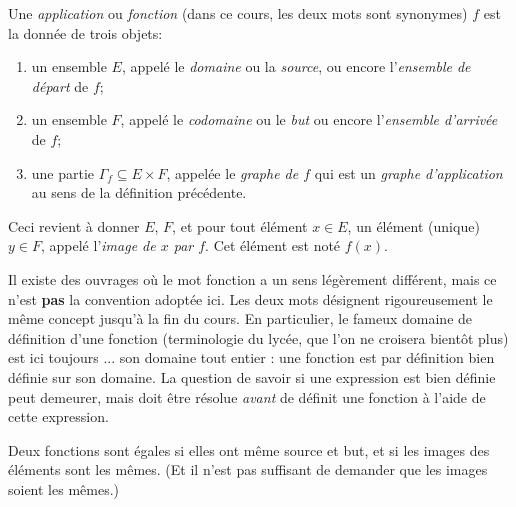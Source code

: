 \begin{definition}
Une \emph{application} ou \emph{fonction} (dans ce cours, les deux mots sont synonymes) $f$ est la donnée de trois objets:
\begin{enumerate}
\item un ensemble $E$, appelé le \emph{domaine} ou la \emph{source}, ou encore l'\emph{ensemble de départ} de $f$;
\item un ensemble $F$, appelé le \emph{codomaine} ou le \emph{but} ou encore l'\emph{ensemble d'arrivée} de $f$;
\item une partie $\Gamma_f \subseteq E\times F$, appelée le \emph{graphe de $f$} qui est un \emph{graphe d'application} au sens de la définition précédente. 
\end{enumerate}
Ceci revient à donner $E$, $F$, et pour tout élément $x \in E$, un élément (unique) $y\in F$, appelé l'\emph{image de $x$ par $f$}. Cet élément est noté $f(x)$.
\end{definition}

\begin{attention}
Il existe des ouvrages où le mot \og fonction\fg{} a un sens légèrement différent, mais ce n'est \textbf{pas} la convention adoptée ici. Les deux mots désignent rigoureusement le même concept jusqu'à la fin du cours. En particulier, le fameux \og domaine de définition d'une fonction\fg{} (terminologie du lycée, que l'on ne croisera bientôt plus) est ici toujours ...  son domaine tout entier : une fonction est par définition bien définie sur son domaine. La question de savoir si une expression est bien définie peut demeurer, mais doit être résolue \emph{avant} de définit une fonction à l'aide de cette expression.
\end{attention}

Deux fonctions sont égales si elles ont même source et but, et si les images des éléments sont les mêmes. (Et il n'est pas suffisant de demander que les images soient les mêmes.)



